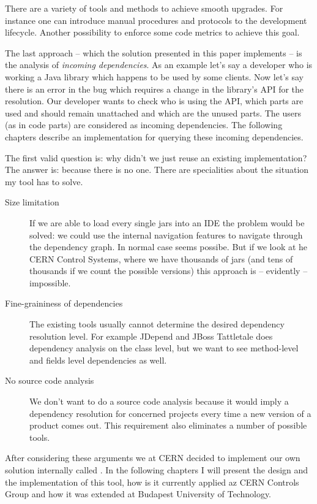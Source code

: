There are a variety of tools and methods to achieve smooth upgrades. For
instance one can introduce manual procedures and protocols to the development
lifecycle. Another possibility to enforce some code metrics to achieve this
goal.

The last approach -- which the solution presented in this paper implements -- is
the analysis of \emph{incoming dependencies}. As an example let's say a
developer who is working a Java library which happens to be used by some
clients. Now let's say there is an error in the bug which requires a change in
the library's API for the resolution. Our developer wants to check who is using
the API, which parts are used and should remain unattached and which are the
unused parts. The users (as in code parts) are considered as incoming
dependencies. The following chapters describe an implementation for querying these 
incoming dependencies. 
 
The first valid question is: why didn't we just reuse an existing
implementation? The answer is: because there is no one.
There are specialities about the situation my tool has to solve.
\begin{description}
\item[Size limitation] If we are able to load every single jars into an IDE the
problem would be solved: we could use the internal navigation features to navigate 
through the dependency graph. In normal case seems possibe. 
But if we look at he CERN Control Systems, where we have thousands of jars (and tens of 
thousands if we count the possible versions) this approach is -- evidently -- impossible.   
\item[Fine-graininess of dependencies] The existing tools usually cannot determine
the desired dependency resolution level. For example JDepend \cite{JDepend} and
JBoss Tattletale \cite{Tattletale} does dependency analysis on the class level,
but we want to see method-level and fields level dependencies as well.
\item[No source code analysis] We don't want to do a source code analysis because 
it would imply a dependency resolution for concerned projects every time a new version 
of a product comes out. This requirement also eliminates a number of possible tools. 
\end{description}

After considering these arguments we at CERN decided to implement our own
solution internally called \ptool{}. In the following chapters I will present
the design and the implementation of this tool, how is it currently applied az
CERN Controls Group and how it was extended at Budapest University of
Technology.

